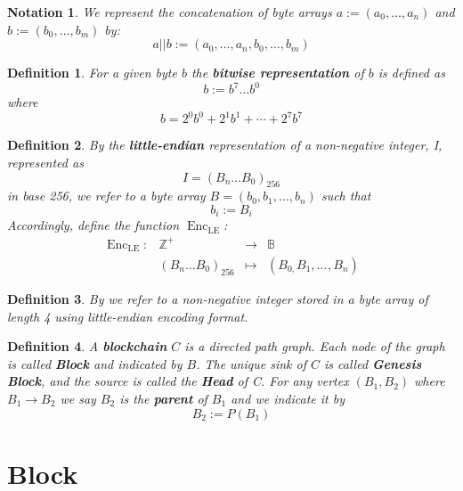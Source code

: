 \documentclass{article}
\newcommand{\assign}{:=}
\newcommand{\tmname}[1]{\textsc{#1}}
\newcommand{\tmop}[1]{\ensuremath{\operatorname{#1}}}
\newcommand{\tmstrong}[1]{\textbf{#1}}
\newcommand{\tmtextbf}[1]{{\bfseries{#1}}}
\newcommand{\tmtextsc}[1]{{\scshape{#1}}}
\newcommand{\tmtexttt}[1]{{\ttfamily{#1}}}
\newcommand{\tmverbatim}[1]{{\ttfamily{#1}}}
\newtheorem{definition}{Definition}
\newtheorem{notation}{Notation}
\providecommand{\tmname}[1]{\tmtextsc{#1}}
\providecommand{\tmop}[1]{\ensuremath{\mathrm{#1}}}
\providecommand{\tmstrong}[1]{\tmtextbf{#1}}
\providecommand{\tmtextbf}[1]{\tmtextbf{#1}}
\providecommand{\tmverbatim}[1]{\tmtexttt{#1}}
\newtheorem{definition}{Definition}
\newtheorem{notation}{Notation}
\begin{document}
\begin{notation}
  We represent the concatenation of byte arrays $a \assign (a_0, \ldots, a_n)$
  and $b \assign (b_0, \ldots, b_m)$ by:
  \[ a || b \assign (a_0, \ldots, a_n, b_0, \ldots, b_m) \]
\end{notation}

\begin{definition}
  \label{defn-bit-rep}For a given byte $b$ the {\tmstrong{bitwise
  representation}} of $b$ is defined as
  \[ b \assign b^7 \ldots b^0 \]
  where
  \[ b = 2^0 b^0 + 2^1 b^1 + \cdots + 2^7 b^7 \]
\end{definition}

\begin{definition}
  \label{defn-little-endian}By \tmverbatim{}the {\tmstrong{little-endian}}
  representation of a non-negative integer, I, represented as
  \[ I = (B_n \ldots B_0)_{256} \]
  in base 256, we refer to a byte array $B = (b_0, b_1, \ldots, b_n)$ such
  that
  \[ b_i \assign B_i \]
  Accordingly, define the function $\tmop{Enc}_{\tmop{LE}}$:
  \[ \begin{array}{llll}
       \tmop{Enc}_{\tmop{LE}} : & \mathbb{Z}^+ & \rightarrow & \mathbb{B}\\
       & (B_n \ldots B_0)_{256} & \mapsto & (B_{0,} B_1, \ldots_{}, B_n)
     \end{array} \]
  
\end{definition}

\begin{definition}
  By {\tmname{{\tmstrong{\tmverbatim{UINT32}}}}} we refer to a non-negative
  integer stored in a byte array of length 4 using little-endian encoding
  format.
\end{definition}

\begin{definition}
  A {\tmstrong{blockchain}} $C$ is a directed path graph. Each node of the
  graph is called {\tmstrong{Block}} and indicated by {\tmstrong{$B$}}. The
  unique sink of $C$ is called {\tmstrong{Genesis Block}}, and the source is
  called the {\tmstrong{Head}} of C. For any vertex $(B_1, B_2)$ where $B_1
  \rightarrow B_2$ we say $B_2$ is the {\tmstrong{parent}} of $B_1$ and we
  indicate it by
  \[ B_2 \assign P (B_1) \]
\end{definition}

\section{Block}
\end{document}
